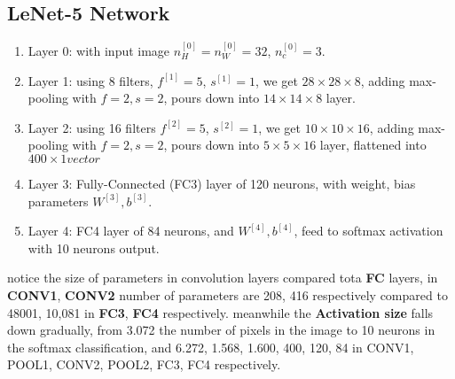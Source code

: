 \documentclass[4apaper,12pt]{book}
\begin{document}
\begin{description}
      \subsection{LeNet-5 Network}
      \begin{enumerate}
      \item Layer 0: with input image $n_H^{[0]}=n_W^{[0]}=32$, $n_c^{[0]}=3$.
    \item Layer 1: using 8 filters, $f^{[1]}=5$, $s^{[1]}=1$, we get $28 \times{28} \times{8}$, adding  max-pooling with $f=2, s=2$, pours down into $14\times{14}\times{8}$ layer.
    \item Layer 2: using 16 filters $f^{[2]}=5$, $s^{[2]}=1$, we get $10 \times{10} \times{16}$, adding  max-pooling with $f=2, s=2$, pours down into $5\times{5}\times{16}$ layer, flattened into $400\times{1} vector$
    \item Layer 3: Fully-Connected (FC3) layer of 120 neurons, with weight, bias parameters $W^{[3]}, b^{[3]}$.
    \item Layer 4: FC4 layer of 84 neurons, and $W^{[4]},b^{[4]}$, feed to softmax activation with 10 neurons output.
      \end{enumerate}
    \item notice the size of parameters in convolution layers compared tota \textbf{FC} layers, in \textbf{CONV1}, \textbf{CONV2} number of parameters are 208, 416 respectively compared to 48001, 10,081 in \textbf{FC3}, \textbf{FC4} respectively. meanwhile the \textbf{Activation size} falls down gradually, from 3.072 the number of pixels in the image to 10 neurons in the softmax classification, and 6.272, 1.568, 1.600, 400, 120, 84 in CONV1, POOL1, CONV2, POOL2, FC3, FC4 respectively.
  \end{description}
\end{document}
